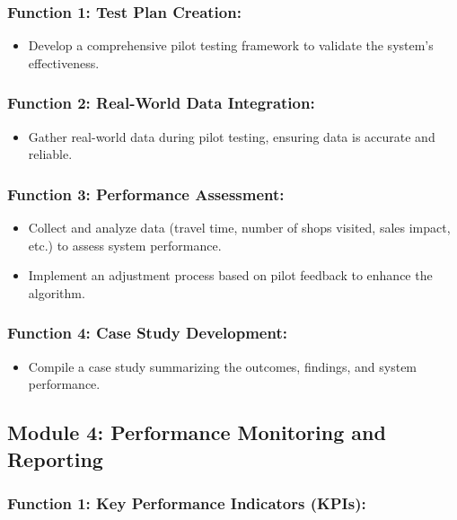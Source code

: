 \subsubsection*{Function 1: Test Plan Creation: 
}

\begin{itemize}
    \item Develop a comprehensive pilot testing framework to validate the system's effectiveness.
\end{itemize}
\subsubsection*{Function 2: Real-World Data Integration: }

\begin{itemize}
    \item Gather real-world data during pilot testing, ensuring data is accurate and reliable.
\end{itemize}

\subsubsection*{Function 3: Performance Assessment: }
\begin{itemize}
    \item Collect and analyze data (travel time, number of shops visited, sales impact, etc.) to assess system performance.
    \item Implement an adjustment process based on pilot feedback to enhance the algorithm.
\end{itemize}

\subsubsection*{Function 4: Case Study Development: }

\begin{itemize}
    \item Compile a case study summarizing the outcomes, findings, and system performance.
\end{itemize}

\subsection*{Module 4: Performance Monitoring and Reporting }

\subsubsection*{Function 1: Key Performance Indicators (KPIs): }

